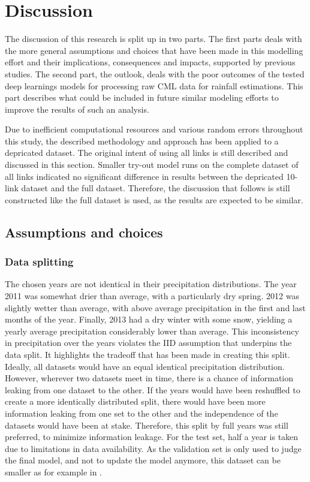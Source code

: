 \documentclass[twocolumn, 10pt, a4paper]{memoir}
\begin{document}
	
	
	\chapter{Discussion} \label{ch: discussion}
	The discussion of this research is split up in two parts. The first parts deals with the more general assumptions and choices that have been made in this modelling effort and their implications, consequences and impacts, supported by previous studies. The second part, the outlook, deals with the poor outcomes of the tested deep learnings models for processing raw CML data for rainfall estimations. This part describes what could be included in future similar modeling efforts to improve the results of such an analysis.  
	
	Due to inefficient computational resources and various random errors throughout this study, the described methodology and approach has been applied to a depricated dataset. The original intent of using all links is still described and discussed in this section. Smaller try-out model runs on the complete dataset of all links indicated no significant difference in results between the depricated 10-link dataset and the full dataset. Therefore, the discussion that follows is still constructed like the full dataset is used, as the results are expected to be similar. 
	
	\section{Assumptions and choices}
	\subsection{Data splitting} \label{sec: discussion datasplitting}
	The chosen years are not identical in their precipitation distributions. The year 2011 was somewhat drier than average, with a particularly dry spring. 2012 was slightly wetter than average, with above average precipitation in the first and last months of the year. Finally, 2013 had a dry winter with some snow, yielding a yearly average precipitation considerably lower than average. \cite{KNMI2022}  
	This inconsistency in precipitation over the years violates the IID assumption that underpins the data split. It highlights the tradeoff that has been made in creating this split. Ideally, all datasets would have an equal identical precipitation distribution. However, wherever two datasets meet in time, there is a chance of information leaking from one dataset to the other. If the years would have been reshuffled to create a more identically distributed split, there would have been more information leaking from one set to the other and the independence of the datasets would have been at stake. Therefore, this split by full years was still preferred, to minimize information leakage. For the test set, half a year is taken due to limitations in data availability. As the validation set is only used to judge the final model, and not to update the model anymore, this dataset can be smaller as for example in .
	
\end{document}
